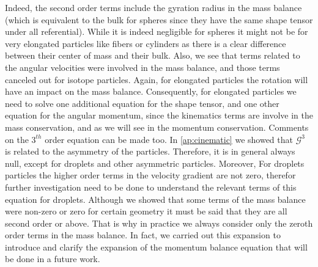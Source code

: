Indeed, the second order terms include the gyration radius in the mass balance (which is equivalent to the bulk for spheres since they have the same shape tensor under all referential).
While it is indeed negligible for spheres it might not be for very elongated particles like fibers or cylinders as there is a clear difference between their center of mass and their bulk.
Also, we see that terms related to the angular velocities were involved in the mass balance, and those terms canceled out for isotope particles.
Again, for elongated particles the rotation will have an impact on the mass balance.  
Consequently, for elongated particles we need to solve one additional equation for the shape tensor, and one other equation for the angular momentum, since the kinematics   terms are involve in the mass conservation, and as we will see in the momentum conservation.  
Comments on the $3^{th}$ order equation can be made too. 
In \ref{ap:cinematic} we showed that $\mathcal{G}^3$ is related to the asymmetry of the particles.
Therefore, it is in general always null, except for droplets and other asymmetric particles. 
Moreover, For droplets particles the higher order terms in the velocity gradient are not zero, therefor further investigation need to be done to understand the relevant terms of this equation for droplets.
Although we showed that some terms of the mass balance were non-zero or zero for certain geometry  it must be said that they are all second order or above.
That is why in practice we always consider only the zeroth order terms in the mass balance. 
In fact, we carried out this expansion to introduce and clarify the expansion of the momentum balance equation that will be done in a future work. 

